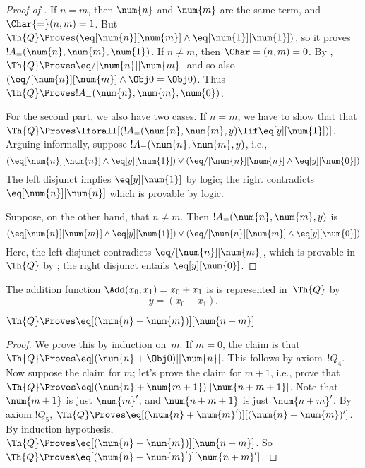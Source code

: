 \documentclass[../../../include/open-logic-section]{subfiles}
\begin{document}
\begin{proof}[Proof of ]
If $n = m$, then $\num{n}$ and $\num{m}$ are the same term, and
$\Char{=}(n, m) = 1$. But $\Th{Q} \Proves (\eq[\num{n}][\num{m}] \land
\eq[\num{1}][\num{1}])$, so it proves $!A_=(\num{n}, \num{m},
\num{1})$.  If $n \neq m$, then $\Char=(n, m) = 0$. By
, $\Th{Q} \Proves \eq/[\num{n}][\num{m}]$ and
so also $(\eq/[\num{n}][\num{m}] \land \Obj 0 = \Obj 0)$. Thus $\Th{Q}
\Proves !A_=(\num{n}, \num{m}, \num{0})$.

For the second part, we also have two cases. If $n = m$, we have to
show that that $\Th{Q} \Proves \lforall[(!A_=(\num{n}, \num{m}, y)
  \lif \eq[y][\num{1}])]$.  Arguing informally, suppose $!A_=(\num{n},
\num{m}, y)$, i.e.,
\[
(\eq[\num{n}][\num{n}] \land \eq[y][\num{1}]) \lor
(\eq/[\num{n}][\num{n}] \land \eq[y][\num{0}])
\]
The left disjunct implies $\eq[y][\num{1}]$ by logic; the right
contradicts $\eq[\num{n}][\num{n}]$ which is provable by logic.

Suppose, on the other hand, that $n \neq m$. Then $!A_=(\num{n},
\num{m}, y)$ is
\[
(\eq[\num{n}][\num{m}] \land \eq[y][\num{1}]) \lor
(\eq/[\num{n}][\num{m}] \land \eq[y][\num{0}])
\]
Here, the left disjunct contradicts $\eq/[\num{n}][\num{m}]$, which is
provable in $\Th{Q}$ by ; the right disjunct
entails $\eq[y][\num{0}]$.
\end{proof}

\begin{prop}
The addition function $\Add(x_0, x_1) = x_0+x_1$ is is represented
in~$\Th{Q}$ by
\[
y = (x_0 + x_1).
\]
\end{prop}

\begin{lem}
$\Th{Q} \Proves \eq[(\num{n} + \num{m})][\num{n+m}]$
\end{lem}

\begin{proof}
We prove this by induction on~$m$. If $m = 0$, the claim is that
$\Th{Q} \Proves \eq[(\num{n} + \Obj 0)][\num{n}]$. This follows by
axiom~$!Q_4$.  Now suppose the claim for $m$; let's prove the claim
for $m+1$, i.e., prove that $\Th{Q} \Proves \eq[(\num{n} +
  \num{m+1})][\num{n+m+1}]$. Note that $\num{m+1}$ is just $\num{m}'$,
and $\num{n+m+1}$ is just $\num{n+m}'$.  By axiom $!Q_5$, $\Th{Q}
\Proves \eq[(\num{n} + \num{m}')][(\num{n}+\num{m})']$. By induction
hypothesis, $\Th{Q} \Proves \eq[(\num{n} + \num{m})][\num{n+m}]$. So
$\Th{Q} \Proves \eq[(\num{n} + \num{m}')][\num{n+m}']$.
\end{proof}
\end{document}
